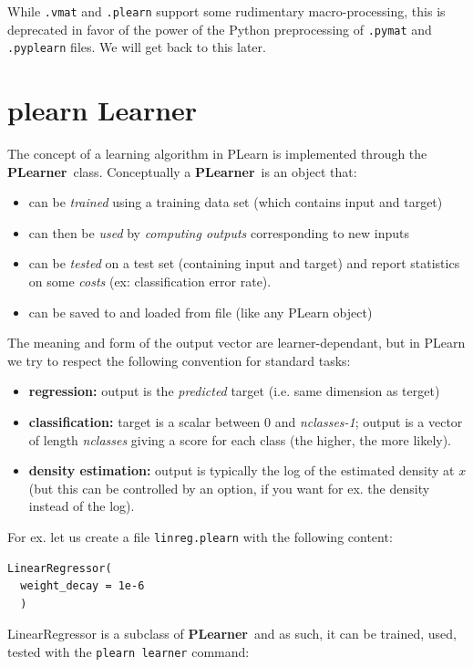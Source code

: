 \documentclass[11pt]{book}
\newcommand{\PLearner}{{\bf PLearner}~}
\begin{document}
While {\tt .vmat} and {\tt .plearn} support some rudimentary
macro-processing, this is deprecated in favor of the power of the Python
preprocessing of {\tt .pymat} and {\tt .pyplearn} files. We will get back
to this later.

\section{plearn Learner}

The concept of a learning algorithm in PLearn is implemented through the \PLearner class.
Conceptually a \PLearner is an object that:
\begin{itemize}
\item can be {\em trained} using a training data set (which contains input and target)
\item can then be {\em used} by {\em computing outputs} corresponding to new inputs
\item can be {\em tested} on a test set (containing input and target) and
  report statistics on some {\em costs} (ex: classification error rate).
\item can be saved to and loaded from file (like any PLearn object)
\end{itemize}

The meaning and form of the output vector are learner-dependant, but in PLearn we try to respect 
the following convention for standard tasks:
\begin{itemize}
\item {\bf regression:} output is the {\em predicted} target (i.e. same dimension as terget)
\item {\bf classification:} target is a scalar between $0$ and {\em
    nclasses-1}; output is a vector of length {\em nclasses} giving a score for each class (the higher, the more likely).
\item {\bf density estimation:} output is typically the log of the estimated density at $x$ (but this can be controlled by an option, if you want for ex. the density instead of the log).
\end{itemize}

For ex. let us create a file \verb!linreg.plearn! with the following content:
\begin{verbatim}
LinearRegressor(
  weight_decay = 1e-6
  )
\end{verbatim}

LinearRegressor is a subclass of \PLearner and as such, it can be trained,
used, tested with the \verb!plearn learner! command:
\end{document}
